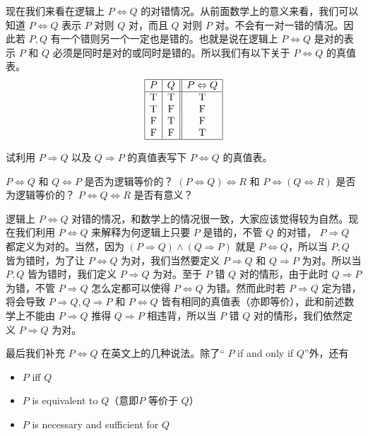 现在我们来看在逻辑上 \(P \Leftrightarrow Q\) 的对错情况。从前面数学上的意义来看，我们可以知道 \(P \Leftrightarrow Q\) 表示 \(P\) 对则 \(Q\) 对，而且 \(Q\) 对则 \(P\) 对。不会有一对一错的情况。因此若 \(P, Q\) 有一个错则另一个一定也是错的。也就是说在逻辑上 \(P \Leftrightarrow Q\) 是对的表示 \(P\) 和 \(Q\) 必须是同时是对的或同时是错的。所以我们有以下关于 \(P \Leftrightarrow Q\) 的真值表。
\[
\begin{array}{|c|c||c|}
\hline
P & Q & P \Leftrightarrow Q \\
\hline
\mathrm{T} & \mathrm{T} & \mathrm{T} \\
\mathrm{T} & \mathrm{F} & \mathrm{F} \\
\mathrm{F} & \mathrm{T} & \mathrm{F} \\
\mathrm{F} & \mathrm{F} & \mathrm{T} \\
\hline
\end{array}
\]

\begin{question}
试利用 \(P \Rightarrow Q\) 以及 \(Q \Rightarrow P\) 的真值表写下 \(P \Leftrightarrow Q\) 的真值表。
\end{question}

\begin{question}
\(P \Leftrightarrow Q\) 和 \(Q \Leftrightarrow P\) 是否为逻辑等价的？ \((P \Leftrightarrow Q) \Leftrightarrow R\) 和 \(P \Leftrightarrow (Q \Leftrightarrow R)\) 是否为逻辑等价的？ \(P \Leftrightarrow Q \Leftrightarrow R\) 是否有意义？
\end{question}

逻辑上 \(P \Leftrightarrow Q\) 对错的情况，和数学上的情况很一致，大家应该觉得较为自然。现在我们利用 \(P \Leftrightarrow Q\) 来解释为何逻辑上只要 \(P\) 是错的，不管 \(Q\) 的对错， \(P \Rightarrow Q\) 都定义为对的。当然，因为 \((P \Rightarrow Q) \land (Q \Rightarrow P)\) 就是 \(P \Leftrightarrow Q\)，所以当 \(P, Q\) 皆为错时，为了让 \(P \Leftrightarrow Q\) 为对，我们当然要定义 \(P \Rightarrow Q\) 和 \(Q \Rightarrow P\) 为对。所以当 \(P, Q\) 皆为错时，我们定义 \(P \Rightarrow Q\) 为对。至于 \(P\) 错 \(Q\) 对的情形，由于此时 \(Q \Rightarrow P\) 为错，不管 \(P \Rightarrow Q\) 怎么定都可以使得 \(P \Leftrightarrow Q\) 为错。然而此时若 \(P \Rightarrow Q\) 定为错，将会导致 \(P \Rightarrow Q, Q \Rightarrow P\) 和 \(P \Leftrightarrow Q\) 皆有相同的真值表（亦即等价），此和前述数学上不能由 \(P \Rightarrow Q\) 推得 \(Q \Rightarrow P\) 相违背，所以当 \(P\) 错 \(Q\) 对的情形，我们依然定义 \(P \Rightarrow Q\) 为对。

最后我们补充 \(P \Leftrightarrow Q\) 在英文上的几种说法。除了“ \(P\) if and only if \(Q\)”外，还有
\begin{itemize}
\item \(P\) iff \(Q\)
\item \(P\) is equivalent to \(Q\)（意即\(P\) 等价于 \(Q\)）
\item \(P\) is necessary and sufficient for \(Q\)
\end{itemize}

